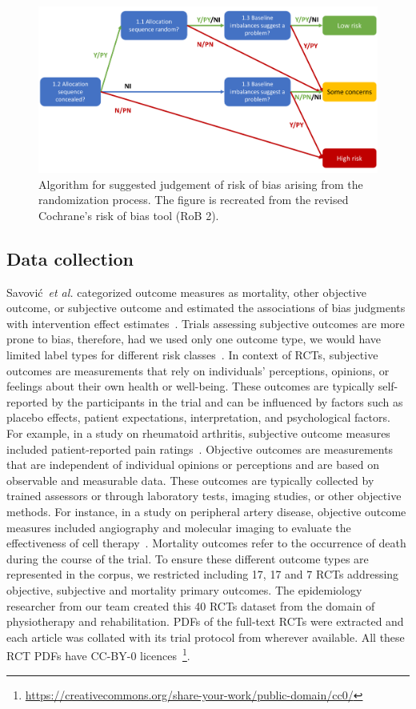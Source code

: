 \documentclass[sn-mathphys,Numbered]{sn-jnl}%
\theoremstyle{thmstyleone}%
\theoremstyle{thmstyletwo}%
\theoremstyle{thmstylethree}%
\begin{document}
%
%
%
\begin{figure}
    \centering
    \includegraphics[width=0.80\columnwidth]{figures/flowchart.pdf}
    \caption{Algorithm for suggested judgement of risk of bias arising from the randomization process. The figure is recreated from the revised Cochrane's risk of bias tool (RoB 2).~\cite{sterne2019rob}}
    \label{fig:flowchart}
\end{figure}
%
%
%

%
%
%
\subsection{Data collection}
\label{data}
%
Savović~\textit{et al.} categorized outcome measures as mortality, other objective outcome, or subjective outcome and estimated the associations of bias judgments with intervention effect estimates~\cite{savovic2018association}.
Trials assessing subjective outcomes are more prone to bias, therefore, had we used only one outcome type, we would have limited label types for different risk classes~\cite{page2016empirical}.
In context of RCTs, subjective outcomes are measurements that rely on individuals' perceptions, opinions, or feelings about their own health or well-being.
These outcomes are typically self-reported by the participants in the trial and can be influenced by factors such as  placebo effects, patient expectations, interpretation, and psychological factors.
For example, in a study on rheumatoid arthritis, subjective outcome measures included patient-reported pain ratings~\cite{vollert2020assessment}.
Objective outcomes are measurements that are independent of individual opinions or perceptions and are based on observable and measurable data.
These outcomes are typically collected by trained assessors or through laboratory tests, imaging studies, or other objective methods.
For instance, in a study on peripheral artery disease, objective outcome measures included angiography and molecular imaging to evaluate the effectiveness of cell therapy~\cite{grimaldi2016imaging}.
Mortality outcomes refer to the occurrence of death during the course of the trial.
To ensure these different outcome types are represented in the corpus, we restricted including 17, 17 and 7 RCTs addressing objective, subjective and mortality primary outcomes.
The epidemiology researcher from our team created this 40 RCTs dataset from the domain of physiotherapy and rehabilitation.
PDFs of the full-text RCTs were extracted and each article was collated with its trial protocol from wherever available.
All these RCT PDFs have CC-BY-0 licences~\footnote{\url{https://creativecommons.org/share-your-work/public-domain/cc0/}}.
%
%
%
\end{document}
